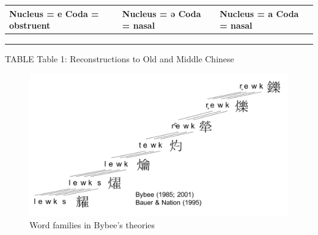 \documentclass[12pt,article,oneside]{memoir}
\theoremstyle{definition}
\theoremstyle{definition}
\theoremstyle{definition}
\theoremstyle{remark}
\begin{document}
\begin{longtable}[]{@{}lll@{}}
\toprule
\begin{minipage}[b]{0.33\columnwidth}\raggedright\strut
Nucleus = e Coda = obstruent\strut
\end{minipage} & \begin{minipage}[b]{0.29\columnwidth}\raggedright\strut
Nucleus = ə Coda = nasal\strut
\end{minipage} & \begin{minipage}[b]{0.29\columnwidth}\raggedright\strut
Nucleus = a Coda = nasal\strut
\end{minipage}\tabularnewline
\midrule
\endhead
\begin{minipage}[t]{0.33\columnwidth}\raggedright\strut
\strut
\end{minipage} & \begin{minipage}[t]{0.29\columnwidth}\raggedright\strut
\strut
\end{minipage} & \begin{minipage}[t]{0.29\columnwidth}\raggedright\strut
\strut
\end{minipage}\tabularnewline
\begin{minipage}[t]{0.33\columnwidth}\raggedright\strut
\strut
\end{minipage} & \begin{minipage}[t]{0.29\columnwidth}\raggedright\strut
\strut
\end{minipage} & \begin{minipage}[t]{0.29\columnwidth}\raggedright\strut
\strut
\end{minipage}\tabularnewline
\begin{minipage}[t]{0.33\columnwidth}\raggedright\strut
\strut
\end{minipage} & \begin{minipage}[t]{0.29\columnwidth}\raggedright\strut
\strut
\end{minipage} & \begin{minipage}[t]{0.29\columnwidth}\raggedright\strut
\strut
\end{minipage}\tabularnewline
\bottomrule
\end{longtable}

TABLE Table 1: Reconstructions to Old and Middle Chinese

\begin{figure}
\includegraphics[width=5in]{ideos/bybee} \caption{Word families in Bybee's theories}\label{fig:bybee}
\end{figure}
\end{document}
